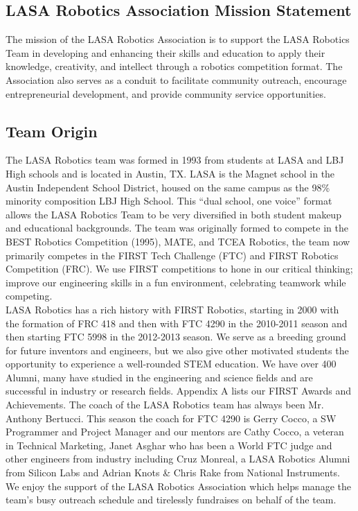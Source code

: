 \subsection{LASA Robotics Association Mission Statement}
The mission of the LASA Robotics Association is to support the LASA Robotics Team in developing and enhancing their skills and education to apply their knowledge, creativity, and intellect through a robotics competition format. The Association also serves as a conduit to facilitate community outreach, encourage entrepreneurial development, and provide community service opportunities.

\subsection{Team Origin}
The LASA Robotics team was formed in 1993 from students at LASA and LBJ High schools and is located in Austin, TX. LASA is the Magnet school in the Austin Independent School District, housed on the same campus as the 98\% minority composition LBJ High School. This “dual school, one voice” format allows the LASA Robotics Team to be very diversified in both student makeup and educational backgrounds.  The team was originally formed to compete in the BEST Robotics Competition (1995), MATE, and TCEA Robotics, the team now primarily competes in the FIRST Tech Challenge (FTC) and FIRST Robotics Competition (FRC).  We use FIRST competitions to hone in our critical thinking; improve our engineering skills in a fun environment, celebrating teamwork while competing.\\

LASA Robotics has a rich history with FIRST Robotics, starting in 2000 with the formation of FRC 418 and then with FTC 4290 in the 2010-2011 season and then starting FTC 5998 in the 2012-2013 season.  We serve as a breeding ground for future inventors and engineers, but we also give other motivated students the opportunity to experience a well-rounded STEM education. We have over 400 Alumni, many have studied in the engineering and science fields and are successful in industry or research fields. Appendix A lists our FIRST Awards and Achievements.   The coach of the LASA Robotics team has always been Mr. Anthony Bertucci. This season the coach for FTC 4290 is Gerry Cocco, a SW Programmer and Project Manager and our mentors are Cathy Cocco, a veteran in Technical Marketing, Janet Asghar who has been a World FTC judge and other engineers from industry including Cruz Monreal, a LASA Robotics Alumni from Silicon Labs and Adrian Knots \& Chris Rake from National Instruments.  We enjoy the support of the LASA Robotics Association which helps manage the team’s busy outreach schedule and tirelessly fundraises on behalf of the team.\\

